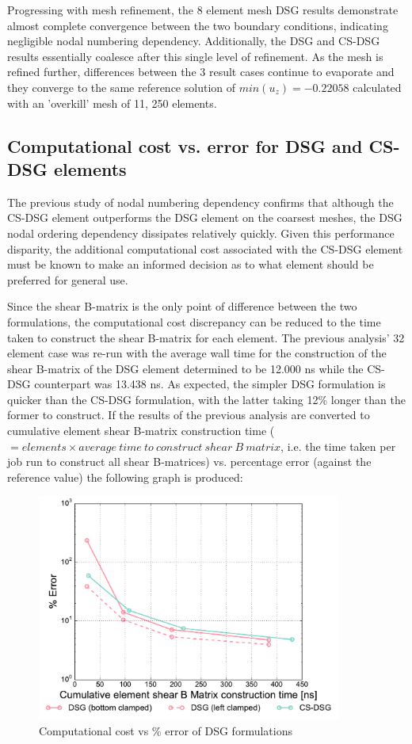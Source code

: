 Progressing with mesh refinement, the 8 element mesh DSG results demonstrate almost complete convergence between the two boundary conditions, indicating negligible nodal numbering dependency. Additionally, the DSG and CS-DSG results essentially coalesce after this single level of refinement. As the mesh is refined further, differences between the 3 result cases continue to evaporate and they converge to the same reference solution of $min(u_z) = -0.22058$ calculated with an 'overkill' mesh of 11, 250 elements.

\subsection{Computational cost vs. error for DSG and CS-DSG elements}
The previous study of nodal numbering dependency confirms that although the CS-DSG element outperforms the DSG element on the coarsest meshes, the DSG nodal ordering dependency dissipates relatively quickly. Given this performance disparity, the additional computational cost associated with the CS-DSG element must be known to make an informed decision as to what element should be preferred for general use. 

Since the shear B-matrix is the only point of difference between the two formulations, the computational cost discrepancy can be reduced to the time taken to construct the shear B-matrix for each element. The previous analysis' 32 element case was re-run with the average wall time for the construction of the shear B-matrix of the DSG element determined to be 12.000 ns while the CS-DSG counterpart was 13.438 ns. As expected, the simpler DSG formulation is quicker than the CS-DSG formulation, with the latter taking 12\% longer than the former to construct. If the results of the previous analysis are converted to cumulative element shear B-matrix construction time ($= elements \times average\ time\ to\ construct\ shear\ B\ matrix$, i.e. the time taken per job run to construct all shear B-matrices) vs. percentage error (against the reference value) the following graph is produced:

\begin{figure}[H]
	\centering
	\includegraphics[width=10cm]{images/node_ordering_study_error.pdf}
	\caption{Computational cost vs \% error of DSG formulations}
	\label{fig:Computational cost vs error of DSG formulations}
\end{figure}

